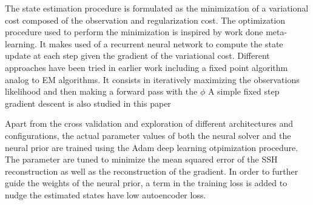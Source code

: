 \begin{bibunit}
The state estimation procedure is formulated as the minimization of a variational cost composed of the observation and regularization cost. The optimization procedure used to perform the minimization is inspired by work done meta-learning. It makes used of a recurrent neural network to compute the state update at each step given the gradient of the variational cost.
Different approaches have been tried in earlier work including a fixed point algorithm analog to EM algorithms. It consists in iteratively maximizing the observations likelihood and then making a forward pass with the $\phi$
A simple fixed step gradient descent is also studied in this paper \cite{}


Apart from the cross validation and exploration of different architectures and configurations, the actual parameter values of both the neural solver and the neural prior are trained using the Adam\cite{} deep learning otpimization procedure. The parameter are tuned to minimize the mean squared error of the SSH reconstruction as well as  the reconstruction of the gradient. In order to further guide the weights of the neural prior, a term in the training loss is added to nudge the estimated states have low autoencoder loss.


\end{bibunit}
